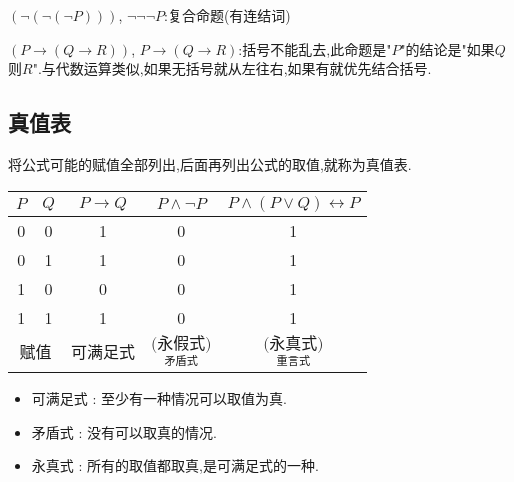 {{{    $(\lnot(\lnot(\lnot P)))$, $\lnot\lnot\lnot P$:复合命题(有连结词)

    $(P \to (Q \to R))$, $P \to (Q \to R)$:括号不能乱去,此命题是"$P$"的结论是"如果$Q$则$R$".与代数运算类似,如果无括号就从左往右,如果有就优先结合括号.
  }%

  \subsection{真值表}{
    将公式可能的赋值全部列出,后面再列出公式的取值,就称为真值表.

    \begin{center}
      \begin{tabular}{c|c|c|c|c}
        \hline
        $P$                       & $Q$      & $P \to Q$                                   & $P \land\lnot P$                            & $P\land(P \lor Q) \leftrightarrow P$ \\
        \hline
        0                         & 0        & 1                                           & 0                                           & 1                                    \\
        0                         & 1        & 1                                           & 0                                           & 1                                    \\
        1                         & 0        & 0                                           & 0                                           & 1                                    \\
        1                         & 1        & 1                                           & 0                                           & 1                                    \\
        \hline
        \multicolumn{2}{c|}{赋值} & 可满足式 & $\underset{\mbox{矛盾式}}{\mbox{(永假式)}}$ & $\underset{\mbox{重言式}}{\mbox{(永真式)}}$
      \end{tabular}
    \end{center}

    \begin{itemize}
      \item 可满足式 : 至少有一种情况可以取值为真.
      \item 矛盾式 : 没有可以取真的情况.
      \item 永真式 : 所有的取值都取真,是可满足式的一种.
    \end{itemize}
  }%

}}
